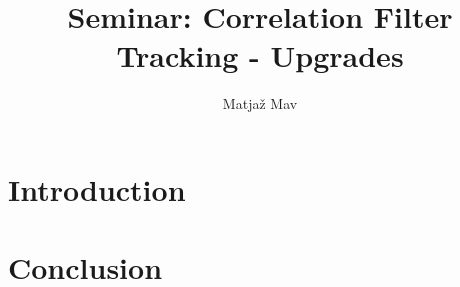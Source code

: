 \documentclass[runningheads]{llncs}
\begin{document}
% 
\title{Seminar: Correlation Filter Tracking - Upgrades}
\author{Matjaž Mav}
%
\maketitle
%
 
\section{Introduction}

\section{Conclusion}
\end{document}
